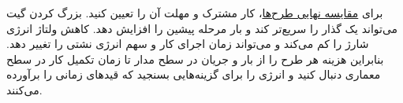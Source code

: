 برای \hyperref[sec:power-energy-delay]{مقایسه نهایی طرح‌ها}، کار
مشترک و مهلت آن را تعیین کنید. بزرگ کردن گیت می‌تواند یک گذار را
سریع‌تر کند و بار مرحله پیشین را افزایش دهد. کاهش ولتاژ انرژی
شارژ را کم می‌کند و می‌تواند زمان اجرای کار و سهم انرژی نشتی را
تغییر دهد. بنابراین هزینه هر طرح را از بار و جریان در سطح مدار تا
زمان تکمیل کار در سطح معماری دنبال کنید و انرژی را برای گزینه‌هایی
بسنجید که قیدهای زمانی را برآورده می‌کنند.
